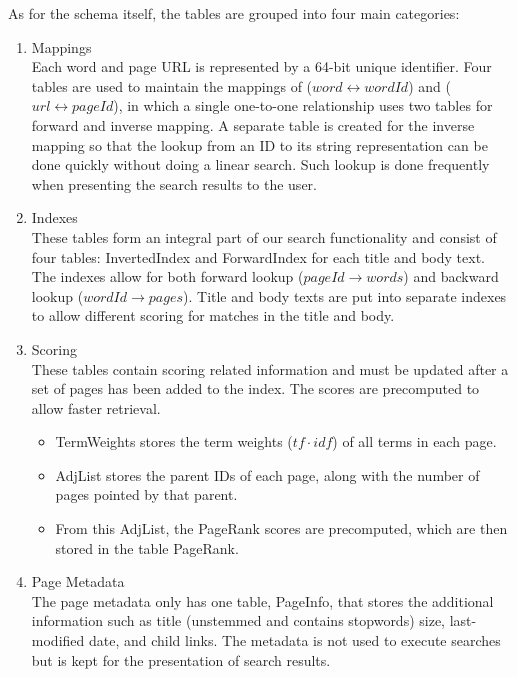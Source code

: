 \documentclass[12pt,a4paper]{article}
\begin{document}
    As for the schema itself, the tables are grouped into four main categories:
    \begin{enumerate}
        \item Mappings \\
        Each word and page URL is represented by a 64-bit unique identifier.
        Four tables are used to maintain the mappings of ($word \leftrightarrow wordId$) and ($url \leftrightarrow pageId$), in which a single one-to-one relationship uses two tables for forward and inverse mapping.
        A separate table is created for the inverse mapping so that the lookup from an ID to its string representation can be done quickly without doing a linear search.
        Such lookup is done frequently when presenting the search results to the user.

        \item Indexes \\
        These tables form an integral part of our search functionality and consist of four tables: InvertedIndex and ForwardIndex for each title and body text.
        The indexes allow for both forward lookup ($pageId \rightarrow words$) and backward lookup ($wordId \rightarrow pages$).
        Title and body texts are put into separate indexes to allow different scoring for matches in the title and body.

        \item Scoring \\
        These tables contain scoring related information and must be updated after a set of pages has been added to the index.
        The scores are precomputed to allow faster retrieval.
        \begin{itemize}
            \item TermWeights stores the term weights ($tf \cdot idf$) of all terms in each page.
            \item AdjList stores the parent IDs of each page, along with the number of pages pointed by that parent.
            \item From this AdjList, the PageRank scores are precomputed, which are then stored in the table PageRank.
        \end{itemize}

        \item Page Metadata \\
        The page metadata only has one table, PageInfo, that stores the additional information such as title (unstemmed and contains stopwords) size, last-modified date, and child links.
        The metadata is not used to execute searches but is kept for the presentation of search results.

    \end{enumerate}
\end{document}
